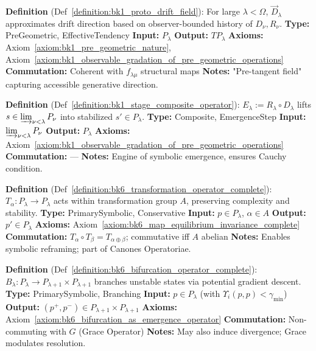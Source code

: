 \begin{description}[leftmargin=2.5cm, style=nextline]
\item[\textbf{Proto--Drift Field} \hfill \( \vec{D}_{\lambda} \)] 
\label{dict:appA_proto_drift_field}
\textbf{Definition} (Def~\ref{definition:bk1_proto_drift_field}): For large \( \lambda < \Omega \), \( \vec{D}_{\lambda} \) approximates drift direction based on observer-bounded history of \( D_\nu, R_\nu \).
\textbf{Type:} PreGeometric, EffectiveTendency
\textbf{Input:} \( P_\lambda \)
\textbf{Output:} \( T P_\lambda \)
\textbf{Axioms:} Axiom~\ref{axiom:bk1_pre_geometric_nature}, Axiom~\ref{axiom:bk1_observable_gradation_of_pre_geometric_operations}
\textbf{Commutation:} Coherent with \( f_{\lambda\mu} \) structural maps
\textbf{Notes:} "Pre-tangent field" capturing accessible generative direction.

\item[\textbf{Stage--Composite Operator} \hfill \( E_{\lambda} \)] 
\label{dict:appA_stage_composite_operator}
\textbf{Definition} (Def~\ref{definition:bk1_stage_composite_operator}): \( E_{\lambda} := R_{\lambda} \circ D_{\lambda} \) lifts \( s \in \varinjlim_{\nu<\lambda} P_\nu \) into stabilized \( s' \in P_\lambda \).
\textbf{Type:} Composite, EmergenceStep
\textbf{Input:} \( \varinjlim_{\nu<\lambda} P_\nu \)
\textbf{Output:} \( P_\lambda \)
\textbf{Axioms:} Axiom~\ref{axiom:bk1_observable_gradation_of_pre_geometric_operations}
\textbf{Commutation:} ---
\textbf{Notes:} Engine of symbolic emergence, ensures Cauchy condition.

\item[\textbf{Transformation Operator} \hfill \( T_{\alpha} \)] 
\label{dict:appA_transformation_operator}
\textbf{Definition} (Def~\ref{definition:bk6_transformation_operator_complete}): \( T_\alpha : P_\lambda \rightarrow P_\lambda \) acts within transformation group \( A \), preserving complexity and stability.
\textbf{Type:} PrimarySymbolic, Conservative
\textbf{Input:} \( p \in P_\lambda \), \( \alpha \in A \)
\textbf{Output:} \( p' \in P_\lambda \)
\textbf{Axioms:} Axiom~\ref{axiom:bk6_map_equilibrium_invariance_complete}
\textbf{Commutation:} \( T_\alpha \circ T_\beta = T_{\alpha \oplus \beta} \); commutative iff \( A \) abelian
\textbf{Notes:} Enables symbolic reframing; part of Canones Operatoriae.

\item[\textbf{Bifurcation Operator} \hfill \( B_{\lambda} \)] 
\label{dict:appA_bifurcation_operator}
\textbf{Definition} (Def~\ref{definition:bk6_bifurcation_operator_complete}): \( B_\lambda : P_\lambda \rightarrow P_{\lambda+1} \times P_{\lambda+1} \) branches unstable states via potential gradient descent.
\textbf{Type:} PrimarySymbolic, Branching
\textbf{Input:} \( p \in P_\lambda \) (with \( \Upsilon_i(p,p) < \gamma_{\min} \))
\textbf{Output:} \( (p^+, p^-) \in P_{\lambda+1} \times P_{\lambda+1} \)
\textbf{Axioms:} Axiom~\ref{axiom:bk6_bifurcation_as_emergence_operator}
\textbf{Commutation:} Non-commuting with \( G \) (Grace Operator)
\textbf{Notes:} May also induce divergence; Grace modulates resolution.


\end{description}
